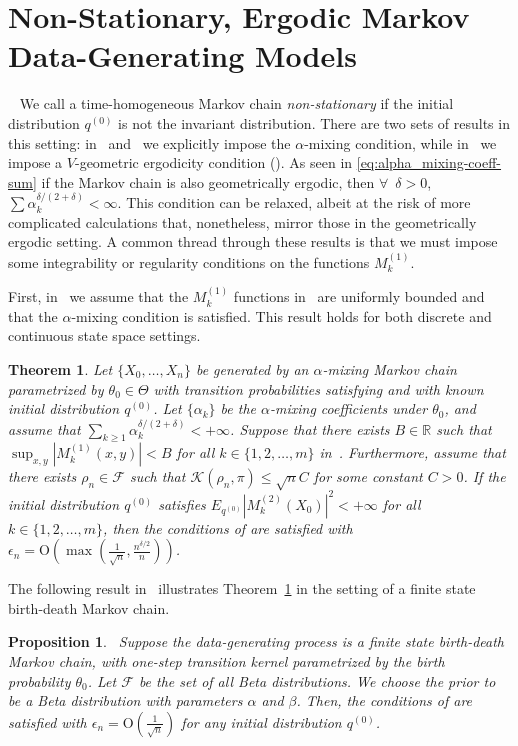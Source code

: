 \documentclass[11pt]{amsart}
\newcommand{\data}{X_0,\dots,X_n}
\newtheorem{theorem}{Theorem}[section]
\newtheorem{proposition}{Proposition}[section]
\begin{document}
\section{Non-Stationary, Ergodic Markov Data-Generating Models}~\label{sec:nsedgm}
We call a time-homogeneous Markov chain \textit{non-stationary} if the initial distribution $q^{(0)}$ is not the invariant distribution. 
There are two sets of results in this setting: in~ and~ we explicitly impose the $\alpha$-mixing condition, while in~ we impose a $V$-geometric ergodicity condition (). As seen in \cref{eq:alpha_mixing-coeff-sum} if the Markov chain is also geometrically ergodic, then $\forall \enspace \delta>0$, $\sum \alpha_k^{\delta/(2+\delta)}<\infty$. This condition can be relaxed, albeit at the risk of more complicated calculations that, nonetheless, mirror those in the geometrically ergodic setting. A common thread through these results is that we must impose some integrability or regularity conditions on the functions $M^{(1)}_k$.

First, in~ we assume that the $M^{(1)}_k$ functions in~ are uniformly bounded and that the $\alpha$-mixing condition is satisfied. This result holds for both discrete and continuous state space settings. 

\begin{theorem}\label{thm:bound-func}
  Let $\{\data\}$ be generated by an $\alpha$-mixing Markov chain parametrized by $\theta_0 \in \Theta$ with transition probabilities satisfying  and with known initial distribution $q^{(0)}$. Let $\{\alpha_k\}$ be the $\alpha$-mixing coefficients under $\theta_0$, and assume that $\sum_{k\geq 1} \alpha_k^{{\delta}/{(2+\delta)}} < +\infty$. Suppose that there exists $B \in \mathbb R$ such that $\sup_{x,y}|M^{(1)}_k(x,y)| < B$ for all $k \in \{1,2,\dots,m\}$ in~. Furthermore, assume that there exists $\rho_n \in \mathcal{F}$ such that $\mathcal{K}(\rho_n,\pi)\leq \sqrt{n}C$ for some constant $C>0$. If the initial distribution $q^{(0)}$ satisfies $E_{q^{(0)}}|M^{(2)}_k(X_0)|^2 < +\infty$ for all $k \in \{1,2,\dots,m\}$, then the conditions of  are satisfied with $\epsilon_n=\mathrm{O}\left(\max(\frac{1}{\sqrt{n}},\frac{n^{\delta/2}}{n})\right)$.
\end{theorem}
The following result in~ illustrates Theorem~\ref{thm:bound-func} in the setting of a finite state birth-death Markov chain.
\begin{proposition}~\label{thm:bd-ns}
Suppose the data-generating process is a finite state birth-death Markov chain, with one-step transition kernel parametrized by the birth probability $\theta_0$. Let $\mathcal{F}$ be the set of all Beta distributions. We choose the prior to be a Beta distribution with parameters $\alpha$ and $\beta$. Then, the conditions of  are satisfied with $\epsilon_n=\mathrm{O}\left(\frac{1}{\sqrt{n}}\right)$ for any initial distribution $q^{(0)}$.
\end{proposition}
\end{document}
